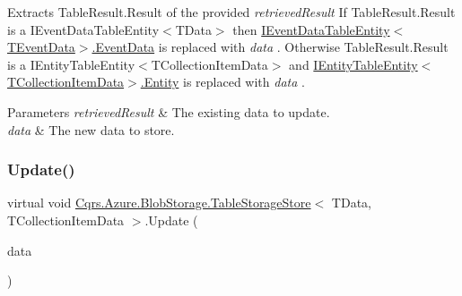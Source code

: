 Extracts Table\+Result.\+Result of the provided {\itshape retrieved\+Result}  If Table\+Result.\+Result is a I\+Event\+Data\+Table\+Entity$<$\+T\+Data$>$ then \hyperlink{interfaceCqrs_1_1Azure_1_1BlobStorage_1_1IEventDataTableEntity_aa7b1f06172ce68c2cb2248be422edfe5_aa7b1f06172ce68c2cb2248be422edfe5}{I\+Event\+Data\+Table\+Entity$<$\+T\+Event\+Data$>$.\+Event\+Data} is replaced with {\itshape data} . Otherwise Table\+Result.\+Result is a I\+Entity\+Table\+Entity$<$\+T\+Collection\+Item\+Data$>$ and \hyperlink{interfaceCqrs_1_1Azure_1_1BlobStorage_1_1IEntityTableEntity_a06bd38e994772fa43bf8f456c1b3d6e2_a06bd38e994772fa43bf8f456c1b3d6e2}{I\+Entity\+Table\+Entity$<$\+T\+Collection\+Item\+Data$>$.\+Entity} is replaced with {\itshape data} . 


\begin{DoxyParams}{Parameters}
{\em retrieved\+Result} & The existing data to update.\\
\hline
{\em data} & The new data to store.\\
\hline
\end{DoxyParams}
\mbox{\label{classCqrs_1_1Azure_1_1BlobStorage_1_1TableStorageStore_aacb673aed5c6f828917f4d2e8c2ff75b_aacb673aed5c6f828917f4d2e8c2ff75b}} 
\subsubsection{\texorpdfstring{Update()}{Update()}\hspace{0.1cm}{\footnotesize\ttfamily [1/2]}}
{\footnotesize\ttfamily virtual void \hyperlink{classCqrs_1_1Azure_1_1BlobStorage_1_1TableStorageStore}{Cqrs.\+Azure.\+Blob\+Storage.\+Table\+Storage\+Store}$<$ T\+Data, T\+Collection\+Item\+Data $>$.Update (\begin{DoxyParamCaption}\item[{T\+Collection\+Item\+Data}]{data }\end{DoxyParamCaption})\hspace{0.3cm}{\ttfamily [virtual]}}

\mbox{\label{classCqrs_1_1Azure_1_1BlobStorage_1_1TableStorageStore_a869eba77358b10fc298f8e13fb21d628_a869eba77358b10fc298f8e13fb21d628}} 
